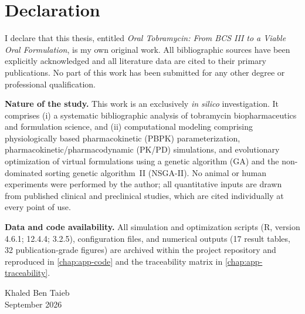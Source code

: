 \chapter*{Declaration}

I declare that this thesis, entitled \textit{Oral Tobramycin: From BCS III to a Viable Oral Formulation}, is my own original work. All bibliographic sources have been explicitly acknowledged and all literature data are cited to their primary publications. No part of this work has been submitted for any other degree or professional qualification.

\medskip
\noindent\textbf{Nature of the study.} This work is an exclusively \emph{in silico} investigation. It comprises (i) a systematic bibliographic analysis of tobramycin biopharmaceutics and formulation science, and (ii) computational modeling comprising physiologically based pharmacokinetic (PBPK) parameterization, pharmacokinetic/pharmacodynamic (PK/PD) simulations, and evolutionary optimization of virtual formulations using a genetic algorithm (GA) and the non-dominated sorting genetic algorithm~II (NSGA-II). No animal or human experiments were performed by the author; all quantitative inputs are drawn from published clinical and preclinical studies, which are cited individually at every point of use.

\medskip
\noindent\textbf{Data and code availability.} All simulation and optimization scripts (R, version 4.6.1;  12.4.4;  3.2.5), configuration files, and numerical outputs (17 result tables, 32 publication-grade figures) are archived within the project repository and reproduced in \cref{chap:app-code} and the traceability matrix in \cref{chap:app-traceability}.

\medskip
\begin{flushright}
Khaled Ben Taieb\\
September 2026
\end{flushright}
